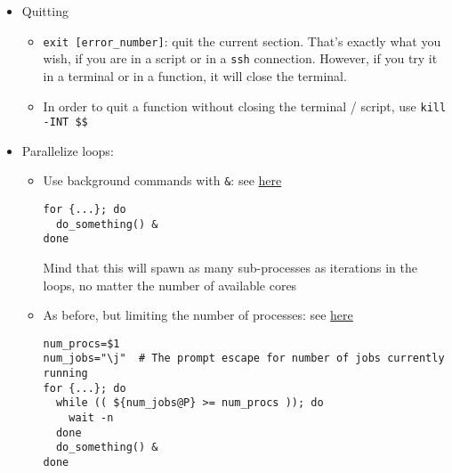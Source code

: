 \documentclass[a4paper,12pt,%
              final%
              ]{article}
\begin{document}
\begin{itemize}
\begin{itemize}
\begin{itemize}
        \end{itemize}
    \end{itemize}
  \item Quitting
    \begin{itemize}
      \item \verb|exit [error_number]|: quit the current section. That's exactly what you wish, if you are in a script or in a \texttt{ssh} connection. However, if you try it in a terminal or in a function, it will close the terminal.
      \item In order to quit a function without closing the terminal / script, use \verb|kill -INT $$|
    \end{itemize}
  \item Parallelize loops:
    \begin{itemize}
      \item Use background commands with \verb|&|: see \href{https://unix.stackexchange.com/questions/103920/parallelize-a-bash-for-loop/103922}{here}
\begin{verbatim}
for {...}; do
  do_something() &
done
\end{verbatim}
        Mind that this will spawn as many sub-processes as iterations in the loops, no matter the number of available cores
      \item As before, but limiting the number of processes: see \href{https://stackoverflow.com/questions/38774355/how-to-parallelize-for-loop-in-bash-limiting-number-of-processes}{here}
\begin{verbatim}
num_procs=$1
num_jobs="\j"  # The prompt escape for number of jobs currently running
for {...}; do
  while (( ${num_jobs@P} >= num_procs )); do
    wait -n
  done
  do_something() &
done
\end{verbatim}
    \end{itemize}
\end{itemize}

\end{document}
